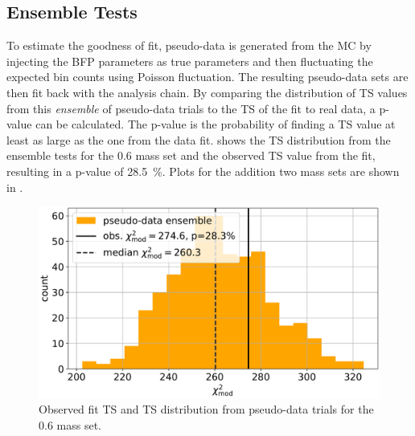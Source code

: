 


\subsection{Ensemble Tests} 

To estimate the goodness of fit, pseudo-data is generated from the MC by injecting the BFP parameters as true parameters and then fluctuating the expected bin counts using Poisson fluctuation. The resulting pseudo-data sets are then fit back with the analysis chain. By comparing the distribution of TS values from this \textit{ensemble} of pseudo-data trials to the TS of the fit to real data, a p-value can be calculated. The p-value is the probability of finding a TS value at least as large as the one from the data fit.  shows the TS distribution from the ensemble tests for the \SI{0.6}{\gev} mass set and the observed TS value from the fit, resulting in a p-value of \SI{28.5}{\percent}. Plots for the addition two mass sets are shown in .

\begin{figure}[h]
    \includegraphics{figures/results/blind_fits/full_blind_fit_0.3_GeV_gauss_plus_poisson_step_3_4-1.png}
	\caption[Pseudo-data trials TS distribution (\SI{0.6}{\gev})]{Observed fit TS and TS distribution from pseudo-data trials for the \SI{0.6}{\gev} mass set.}
\end{figure}


